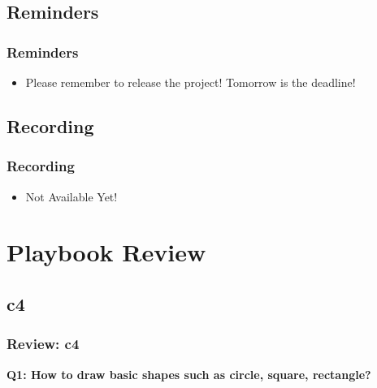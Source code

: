 \documentclass[
	11pt, %
]{beamer}
\begin{document}

\subsection{Reminders}

\begin{frame}
	\frametitle{Reminders}
 
	\begin{itemize}
    \item Please remember to release the project! Tomorrow is the deadline!
\end{itemize}

\end{frame}



\subsection{Recording}

\begin{frame}
	\frametitle{Recording}
 
	\begin{itemize}
 \item Not Available Yet!
\end{itemize}

\end{frame}


\section{Playbook Review}

\subsection{c4}

\begin{frame}
	\frametitle{Review: c4}

	\textbf{Q1: How to draw basic shapes such as circle, square, rectangle?}

\end{frame}

\end{document}
